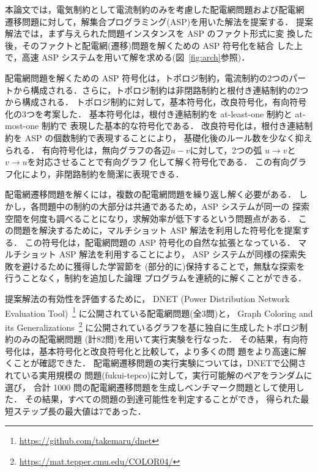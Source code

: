 

本論文では，電気制約として電流制約のみを考慮した配電網問題および配電網
遷移問題に対して，解集合プログラミング(ASP)を用いた解法を提案する．
提案解法では，まず与えられた問題インスタンスを ASP のファクト形式に変
換した後，そのファクトと配電網(遷移)問題を解くための ASP 符号化を結合
した上で，高速 ASP システム{\clingo}を用いて解を求める(図~\ref{fig:arch}参照)．

配電網問題を解くための ASP 符号化は，トポロジ制約，電流制約の2つのパー
トから構成される．さらに，トポロジ制約は非閉路制約と根付き連結制約の2つ
から構成される．
トポロジ制約に対して，基本符号化，改良符号化，有向符号化の3つを考案した．
基本符号化は，根付き連結制約を at-least-one 制約と at-most-one 制約で
表現した基本的な符号化である．
改良符号化は，根付き連結制約を ASP の個数制約で表現することにより，
基礎化後のルール数を少なく抑えられる．
有向符号化は，無向グラフの各辺$u-v$に対して，2つの弧
$u\rightarrow v$と$v\rightarrow u$を対応させることで有向グラフ
化して解く符号化である．
この有向グラフ化により，非閉路制約を簡潔に表現できる．

配電網遷移問題を解くには，複数の配電網問題を繰り返し解く必要がある．
しかし，各問題中の制約の大部分は共通であるため，ASP システムが同一の
探索空間を何度も調べることになり，求解効率が低下するという問題点がある．
この問題を解決するために，マルチショット ASP 解法を利用した符号化を提案する．
この符号化は，配電網問題の ASP 符号化の自然な拡張となっている．
マルチショット ASP 解法を利用することにより，
ASP システムが同様の探索失敗を避けるために獲得した学習節を
(部分的に)保持することで，無駄な探索を行うことなく，制約を追加した論理
プログラムを連続的に解くことができる．



提案解法の有効性を評価するために，
DNET (Power Distribution Network Evaluation Tool)~\footnote{%
\url{https://github.com/takemaru/dnet}}
に公開されている配電網問題(全3問)と，
Graph Coloring and its Generalizations~\footnote{%
\url{https://mat.tepper.cmu.edu/COLOR04/}}
に公開されているグラフを基に独自に生成したトポロジ制約のみの配電網問題
(計82問)を用いて実行実験を行なった．
その結果，有向符号化は，基本符号化と改良符号化と比較して，より多くの問
題をより高速に解くことが確認できた．
%
配電網遷移問題の実行実験については，DNETで公開されている実用規模の
問題({\sf fukui-tepco})に対して，実行可能解のペアをランダムに選び，
合計 1000 問の配電網遷移問題を生成しベンチマーク問題として使用した．
その結果，すべての問題の到達可能性を判定することができ，
得られた最短ステップ長の最大値は7であった．


